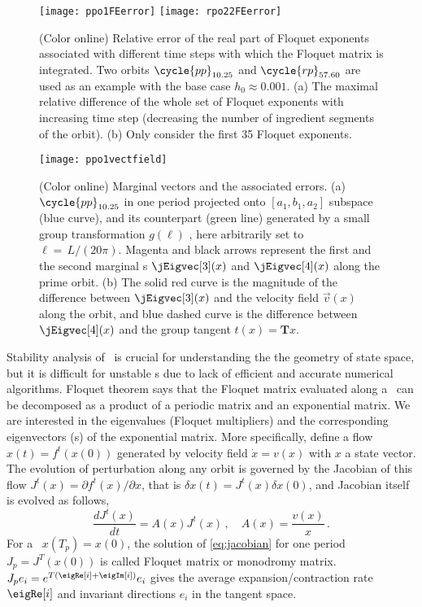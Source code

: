 \begin{figure}[h]
  \centering
  \texttt{[image: ppo1FEerror]} \hfill
  \texttt{[image: rpo22FEerror]}
  \caption{(Color online) Relative error of the real part of
    Floquet exponents associated with different time steps
    with which the Floquet matrix is integrated. Two orbits $\cycle{pp}_{10.25}$
    and $\cycle{rp}_{57.60}$ are used as an example with the base
    case $h_0 \approx 0.001$. (a) The maximal relative difference of
    the whole set of Floquet exponents with increasing time step (decreasing
    the number of ingredient segments of the orbit). (b) Only consider
    the first 35 Floquet exponents.}
  \label{fig:FEerror}
\end{figure}
\begin{figure}[h]
  \centering
  \texttt{[image: ppo1vectfield]}
  \caption{(Color online)
    Marginal vectors and the associated errors.
    (a) $\cycle{pp}_{10.25}$ in one period projected onto $[a_{1},b_{1},a_2]$
    subspace (blue curve), and its counterpart (green line) generated by
    a small group transformation $g(\ell)$
    , here arbitrarily set to $\ell= \,L/(20\pi)$. Magenta and black
    arrows represent the first and the second marginal \Fv s
    $\jEigvec[3](x)$ and $\jEigvec[4](x)$ along the prime orbit.
    (b) The solid red curve is the magnitude of the difference between
    $\jEigvec[3](x)$ and the velocity field $\vec{v}(x)$ along the orbit,
    and blue dashed curve is the difference between $\jEigvec[4](x)$ and
    the group tangent $t(x)=\mathbf{T}x$.
  }
  \label{fig:ppo1vectorfield}
\end{figure}


Stability analysis of \eqva\ is crucial for understanding the the geometry of
state space, but it is difficult for unstable \po s
due to lack of efficient and accurate numerical algorithms.
Floquet theorem says that
the Floquet matrix evaluated along a \po\ can be decomposed
as a product of a periodic matrix and an exponential matrix. We are interested
in the eigenvalues (Floquet multipliers) and the corresponding eigenvectors
(\Fv s) of the exponential matrix. More specifically,
define a flow $x(t) = f^t(x(0))$ generated by velocity field $\dot{x} = v(x)$
with $x$ a state vector. The evolution of perturbation along any orbit
is governed by the Jacobian of this flow
$J^t(x) = \partial f^t(x) / \partial x$, that is
$\delta x(t) = J^t(x) \delta x(0) $, and Jacobian itself is evolved as follows,
\begin{equation}
  \label{eq:jacobian}
  \frac{dJ^t(x)}{dt} = A(x)J^t(x)\,,\quad A(x) = \frac{v(x)}{x}
  \,.
\end{equation}
For a \po\ $x(T_p)=x(0)$,
the solution of \eqref{eq:jacobian}
for one period  $J_p = J^T(x(0))$ is called Floquet matrix or monodromy matrix.
$J_p e_i = e^{T(\eigRe[i]+\eigIm[i])} e_i$ gives the average expansion/contraction
rate $\eigRe[i]$ and
invariant directions $e_i$ in the tangent space.

